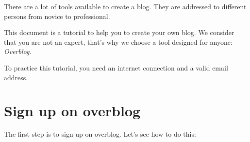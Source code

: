 \documentclass[a4paper,10pt]{article}
\begin{document}
There are a lot of tools available to create a blog. They are addressed to different persons from novice to professional.

This document is a tutorial to help you to create your own blog. We consider that you are not an expert, that's why we choose a tool designed for anyone: \emph{Overblog}.

To practice this tutorial, you need an internet connection and a valid email address.

\newpage
\section{Sign up on overblog}
The first step is to sign up on overblog. Let's see how to do this:
\end{document}
